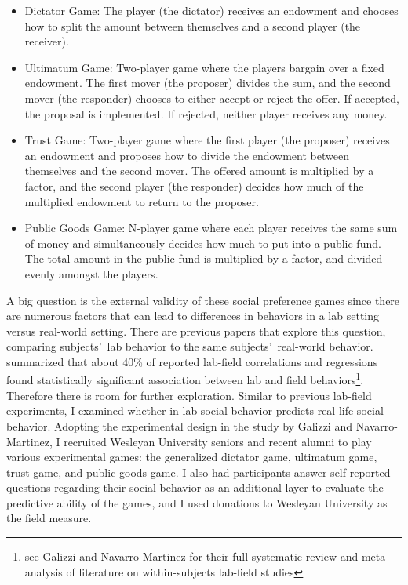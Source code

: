 \documentclass[12pt]{article}
\begin{document}
\begin{itemize}

\item{Dictator Game}: The player (the dictator) receives an endowment and chooses how to split the amount between themselves and a second player (the receiver).
\item{Ultimatum Game}: Two-player game where the players bargain over a fixed endowment. The first mover (the proposer) divides the sum, and the second mover (the responder) chooses to either accept or reject the offer. If accepted, the proposal is implemented. If rejected, neither player receives any money.
\item{Trust Game}: Two-player game where the first player (the proposer) receives an endowment and proposes how to divide the endowment between themselves and the second mover. The offered amount is multiplied by a factor, and the second player (the responder) decides how much of the multiplied endowment to return to the proposer. 
\item{Public Goods Game}: N-player game where each player receives the same sum of money and simultaneously decides how much to put into a public fund. The total amount in the public fund is multiplied by a factor, and divided evenly amongst the players. \end{itemize}

A big question is the external validity of these social preference games since there are numerous factors that can lead to differences in behaviors in a lab setting versus real-world setting. There are previous papers that explore this question, comparing subjects\rq \ lab behavior  to the same subjects\rq \ real-world behavior. \cite{galizzi_navarro-martinez_2017} summarized that about 40\% of reported lab-field correlations and regressions found statistically significant association between lab and field behaviors\footnote{see Galizzi and Navarro-Martinez for their full systematic review and meta-analysis of literature on within-subjects lab-field studies}. Therefore there is room for further exploration. Similar to previous lab-field experiments, I examined whether in-lab social behavior predicts real-life social behavior. Adopting the experimental design in the study by Galizzi and Navarro-Martinez, I recruited Wesleyan University seniors and recent alumni to play various experimental games: the generalized dictator game, ultimatum game, trust game, and public goods game. I also had participants answer self-reported questions regarding their social behavior as an additional layer to evaluate the predictive ability of the games, and I used donations to Wesleyan University as the field measure.
\end{document}
